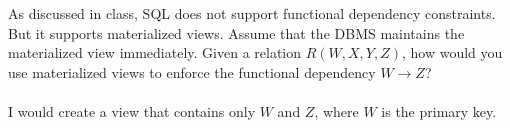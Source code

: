 \documentclass[a4 paper]{article}
\begin{document}
As discussed in class, SQL does not support functional dependency constraints. But it supports materialized views. Assume that the DBMS maintains the materialized view immediately. Given a relation $R(W, X, Y, Z)$, how would you use materialized views to enforce the functional dependency $W \rightarrow Z$?\\\\
I would create a view that contains only $W$ and $Z$, where $W$ is the primary key.
\end{document}
